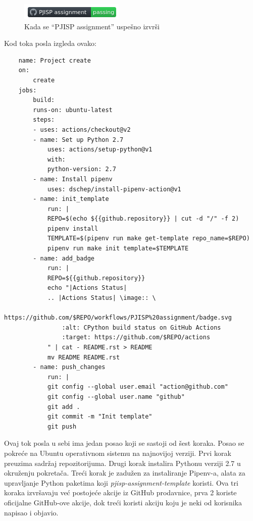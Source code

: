 \documentclass[12pt]{report}
\begin{document}
\begin{figure}[H]
    \centering
    \includegraphics{images/passing.png}
    \caption{Kada se ``PJISP assignment'' uspešno izvrši}
\end{figure}

Kod toka posla izgleda ovako:

\begin{verbatim}
    name: Project create
    on:
        create
    jobs:
        build:
        runs-on: ubuntu-latest
        steps:
        - uses: actions/checkout@v2
        - name: Set up Python 2.7
            uses: actions/setup-python@v1
            with:
            python-version: 2.7
        - name: Install pipenv
            uses: dschep/install-pipenv-action@v1
        - name: init_template
            run: |
            REPO=$(echo ${{github.repository}} | cut -d "/" -f 2)
            pipenv install
            TEMPLATE=$(pipenv run make get-template repo_name=$REPO)
            pipenv run make init template=$TEMPLATE
        - name: add_badge
            run: |
            REPO=${{github.repository}}
            echo "|Actions Status|
            .. |Actions Status| \image:: \
                https://github.com/$REPO/workflows/PJISP%20assignment/badge.svg
                :alt: CPython build status on GitHub Actions
                :target: https://github.com/$REPO/actions
            " | cat - README.rst > README
            mv README README.rst
        - name: push_changes
            run: |
            git config --global user.email "action@github.com"
            git config --global user.name "github"
            git add .
            git commit -m "Init template"
            git push
\end{verbatim}

Ovaj tok posla u sebi ima jedan posao koji se sastoji od šest koraka. Posao se pokreće na Ubuntu operativnom sistemu na najnovijoj verziji. Prvi korak preuzima sadržaj repozitorijuma. Drugi korak instalira Pythonu verziji 2.7 u okruženju pokretača. Treći korak je zadužen za instaliranje Pipenv-a, alata za upravljanje Python paketima koji \textit{pjisp-assignment-template} koristi. Ova tri koraka izvršavaju već postojeće akcije iz GitHub prodavnice, prva 2 koriste oficijalne GitHub-ove akcije, dok treći koristi akciju koju je neki od korisnika napisao i objavio.
\end{document}
